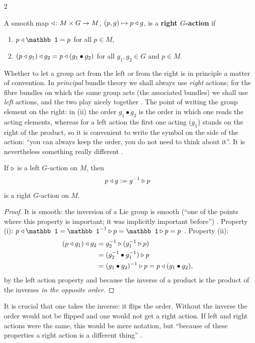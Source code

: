 \begin{paracol}{2}
\begin{definition}\label{def:pb-right}
A smooth map $\mathbin{\triangleleft}\colon M\times G\to M$, $(p,g)\mapsto p\mathbin{\triangleleft} g$, is a \textbf{right $G$-action} if
\begin{enumerate}
  \item[(i)] $p\ract\mathbb 1=p$ for all $p\in M$,
  \item[(ii)] $(p\mathbin{\triangleleft} g_1)\mathbin{\triangleleft} g_2=p\mathbin{\triangleleft}(g_1\bullet g_2)$ for all $g_1,g_2\in G$ and $p\in M$.
\end{enumerate}
     
\end{definition}
Whether to let a group act from the left or from the right is in principle a matter of convention. In \emph{principal} bundle theory we shall always use \emph{right} actions; for the fibre bundles on which the same group acts (the associated bundles) we shall use \emph{left} actions, and the two play nicely together   . The point of writing the group element on the right: in (ii) the order $g_1\bullet g_2$ is the order in which one reads the acting elements, whereas for a left action the first one acting ($g_1$) stands on the right of the product, so it is convenient to write the symbol on the side of the action: ``you can always keep the order, you do not need to think about it''. It is nevertheless something really different  .

\begin{proposition}\label{prop:pb-right-from-left}
If $\mathbin{\triangleright}$ is a left $G$-action on $M$, then
\[
  p\mathbin{\triangleleft} g:=g^{-1}\mathbin{\triangleright} p
\]
is a right $G$-action on $M$.    
\end{proposition}
\begin{proof}
It is smooth: the inversion of a Lie group is smooth (``one of the points where this property is important; it was implicitly important before'') . Property (i): $p\ract\mathbb 1=\mathbb 1^{-1}\lact p=\mathbb 1\lact p=p$  . Property (ii):
\begin{align*}
  (p\mathbin{\triangleleft} g_1)\mathbin{\triangleleft} g_2&=g_2^{-1}\mathbin{\triangleright}(g_1^{-1}\mathbin{\triangleright} p)\\
  &=(g_2^{-1}\bullet g_1^{-1})\mathbin{\triangleright} p\\
  &=(g_1\bullet g_2)^{-1}\mathbin{\triangleright} p=p\mathbin{\triangleleft}(g_1\bullet g_2),
\end{align*}
by the left action property and because the inverse of a product is the product of the inverses \emph{in the opposite order}.     
\end{proof}
It is crucial that one takes the inverse: it flips the order. Without the inverse the order would not be flipped and one would not get a right action. If left and right actions were the same, this would be mere notation, but ``because of these properties a right action is a different thing''  .


\end{paracol}
